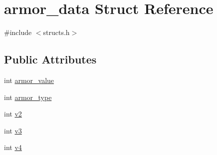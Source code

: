\hypertarget{structarmor__data}{\section{armor\-\_\-data Struct Reference}
\label{structarmor__data}
}


{\ttfamily \#include $<$structs.\-h$>$}

\subsection*{Public Attributes}
\begin{DoxyCompactItemize}
\item 
int \hyperlink{structarmor__data_a3c588b41bef925fa09984bf7ff6488e8}{armor\-\_\-value}
\item 
int \hyperlink{structarmor__data_a8199d5bf7879ab9d0fbdd84817bbc003}{armor\-\_\-type}
\item 
int \hyperlink{structarmor__data_ad2ca09ad88f7b998e693fc751f3f8afd}{v2}
\item 
int \hyperlink{structarmor__data_ad1209b7520bc204359a631758d0abb00}{v3}
\item 
int \hyperlink{structarmor__data_a529fce0de171698bdc500a325628ec79}{v4}
\end{DoxyCompactItemize}


